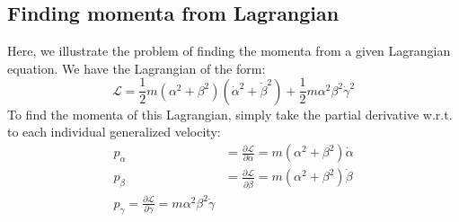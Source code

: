 \subsection{Finding momenta from Lagrangian}

Here, we illustrate the problem of finding the momenta from a given Lagrangian equation. We have the Lagrangian of the form: 
\begin{equation}
    \mathcal{L} = \frac{1}{2}m (\alpha^{2}+ \beta^{2}) (\dot{\alpha}^{2} + \dot{\beta}^{2})+ \frac{1}{2}m\alpha^{2}\beta^{2}\dot{\gamma}^{2}
\end{equation}
To find the momenta of this Lagrangian, simply take the partial derivative w.r.t. to each individual generalized velocity: 
\begin{align*}
    p_{\alpha} & = \frac{\partial \mathcal{L}}{\partial \dot{\alpha}} = m(\alpha^{2}+\beta^{2}) \dot{\alpha}\\
    p_{\beta} & = \frac{\partial \mathcal{L}}{\partial \dot{\beta}} = m(\alpha^{2}+\beta^{2}) \dot{\beta}\\
    p_{\gamma} =  \frac{\partial \mathcal{L}}{\partial \dot{\gamma}} = m\alpha^{2}\beta^{2}\dot{\gamma} 
\end{align*}

